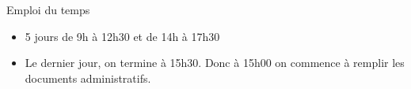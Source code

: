 \begin{frame}{Emploi du temps}
  \begin{itemize}
  \item 5 jours de 9h à 12h30 et de 14h à 17h30
  \item Le dernier jour, on termine à 15h30.
    Donc à 15h00 on commence à remplir les documents administratifs.
  \end{itemize}
\end{frame}

